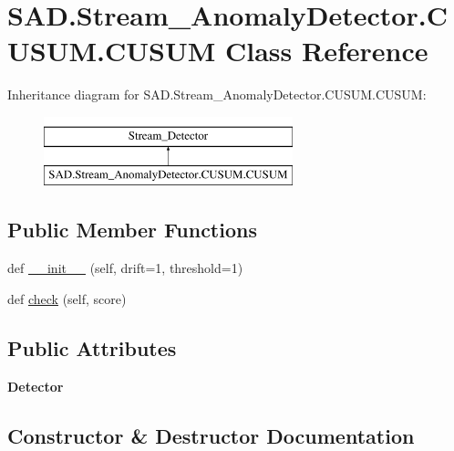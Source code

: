 \hypertarget{classSAD_1_1Stream__AnomalyDetector_1_1CUSUM_1_1CUSUM}{}\section{S\+A\+D.\+Stream\+\_\+\+Anomaly\+Detector.\+C\+U\+S\+U\+M.\+C\+U\+S\+UM Class Reference}
\label{classSAD_1_1Stream__AnomalyDetector_1_1CUSUM_1_1CUSUM}
Inheritance diagram for S\+A\+D.\+Stream\+\_\+\+Anomaly\+Detector.\+C\+U\+S\+U\+M.\+C\+U\+S\+UM\+:\begin{figure}[H]
\begin{center}
\leavevmode
\includegraphics[height=2.000000cm]{classSAD_1_1Stream__AnomalyDetector_1_1CUSUM_1_1CUSUM}
\end{center}
\end{figure}
\subsection*{Public Member Functions}
\begin{DoxyCompactItemize}
\item 
def \hyperlink{classSAD_1_1Stream__AnomalyDetector_1_1CUSUM_1_1CUSUM_aea65fbf9e16b126dad9c1b91fe734a30}{\+\_\+\+\_\+init\+\_\+\+\_\+} (self, drift=1, threshold=1)
\item 
def \hyperlink{classSAD_1_1Stream__AnomalyDetector_1_1CUSUM_1_1CUSUM_a54cc2ba467941bf9413936ee882f456d}{check} (self, score)
\end{DoxyCompactItemize}
\subsection*{Public Attributes}
\begin{DoxyCompactItemize}
\item 
{\bfseries Detector}\hypertarget{classSAD_1_1Stream__AnomalyDetector_1_1CUSUM_1_1CUSUM_a323dd6bb57c96d09d2435fba0541503e}{}\label{classSAD_1_1Stream__AnomalyDetector_1_1CUSUM_1_1CUSUM_a323dd6bb57c96d09d2435fba0541503e}

\end{DoxyCompactItemize}


\subsection{Constructor \& Destructor Documentation}
